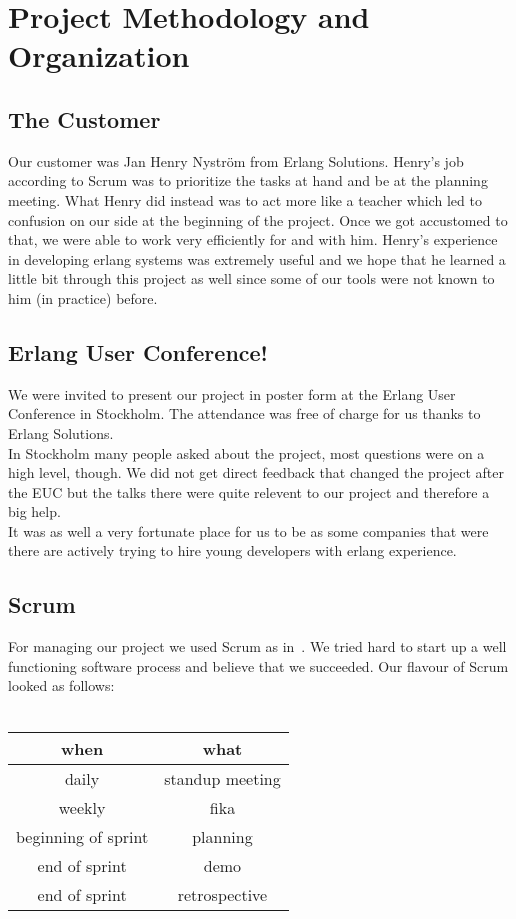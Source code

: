 \documentclass[11pt,a4paper]{report}
\begin{document}
\chapter{Project Methodology and Organization}

\section{The Customer}
Our customer was Jan Henry Nyström from Erlang Solutions. Henry's job according to
Scrum was to prioritize the tasks at hand and be at the planning meeting.
What Henry did instead was to act more like a teacher which led to confusion on
our side at the beginning of the project. Once we got accustomed to that,
we were able to work very efficiently for and with him.
Henry's experience in developing erlang systems was extremely useful and we hope
that he learned a little bit through this project as well since some of our
tools were not known to him (in practice) before.
\section{Erlang User Conference!}
We were invited to present our project in poster form at the
Erlang User Conference in Stockholm. The attendance was free of charge for us thanks to Erlang Solutions. \\
In Stockholm many people asked about the project, most questions were on a high
level, though. We did not get direct feedback that changed the project after the
EUC but the talks there were quite relevent to our project and therefore a big
help. \\
It was as well a very fortunate place for us to be as some companies that were
there are actively trying to hire young developers with erlang experience.
\section{Scrum}
For managing our project we used Scrum as in~\cite{kniberg}.
We tried hard to start up a well functioning software process and believe that
we succeeded. Our flavour of Scrum looked as follows: \\ \\
\begin{tabular}{cc}
  when & what \\ \hline
  daily & standup meeting\\
  weekly & fika \\
  beginning of sprint & planning \\
  end of sprint & demo \\
  end of sprint & retrospective \\
\end{tabular}
\end{document}
